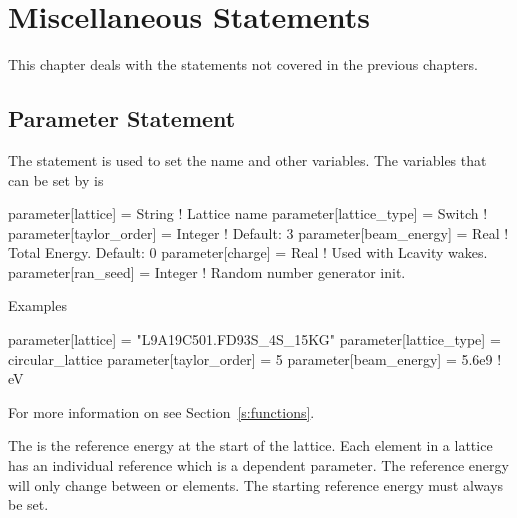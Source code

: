 \chapter{Miscellaneous Statements}

This chapter deals with the statements not covered in the previous chapters.

\section{Parameter Statement}
\label{s:param}


The  statement is used to set the  name and other variables. 
The variables that can be set by  is
\begin{example}
  parameter[lattice]      = String      ! Lattice name 
  parameter[lattice_type] = Switch      ! 
  parameter[taylor_order] = Integer     ! Default: 3
  parameter[beam_energy]  = Real        ! Total Energy. Default: 0
  parameter[charge]       = Real        ! Used with Lcavity wakes. 
  parameter[ran_seed]     = Integer     ! Random number generator init.
\end{example}

\noindent
Examples
\begin{example}
  parameter[lattice]      = "L9A19C501.FD93S_4S_15KG"
  parameter[lattice_type] = circular_lattice
  parameter[taylor_order] = 5
  parameter[beam_energy]  = 5.6e9    ! eV
\end{example}

For more information on  see Section~\ref{s:functions}.

The  is the reference energy at the start of the
lattice.  Each element in a lattice has an individual reference
 which is a dependent parameter. 
The reference energy will only change between  or
 elements. The starting reference energy must always be set.

